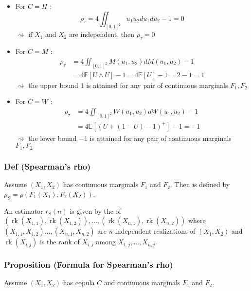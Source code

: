 \begin{itemize}[leftmargin=*]
    \item For $C=\Pi$ :
$$
\rho_{\tau}=4 \iint_{[0,1]^{2}} u_{1} u_{2} d u_{1} d u_{2}-1=0
$$
$\rightsquigarrow$ if $X_{1}$ and $X_{2}$ are independent, then $\rho_{\tau}=0$
    \item For $C=M$ :
$$
\begin{aligned}
\rho_{\tau}&=4 \iint_{[0,1]^{2}} M\left(u_{1}, u_{2}\right) d M\left(u_{1}, u_{2}\right)-1 \\
&=4 \mathbb{E}[U \wedge U]-1=4 \mathbb{E}[U]-1=2-1=1
\end{aligned}
$$
$\rightsquigarrow$ the upper bound 1 is attained for any pair of continuous marginals $F_{1}, F_{2}$
    \item For $C=W$ :
$$
\begin{aligned}
\rho_{\tau}&=4 \iint_{[0,1]^{2}} W\left(u_{1}, u_{2}\right) d W\left(u_{1}, u_{2}\right)-1 \\
&=4 \mathbb{E}\left[(U+(1-U)-1)^{+}\right]-1=-1
\end{aligned}
$$
$\rightsquigarrow$ the lower bound $-1$ is attained for any pair of continuous marginals $F_{1}, F_{2}$
\end{itemize}






\subsubsection*{Def (Spearman’s rho)}
Assume $\left(X_{1}, X_{2}\right)$ has continuous marginals $F_{1}$ and $F_{2}$. Then  is defined by $\rho_{S}=\rho\left(F_{1}\left(X_{1}\right), F_{2}\left(X_{2}\right)\right)$.

An estimator $r_{\mathrm{S}}(n)$ is given by the  of
$ \left(\operatorname{rk}\left(X_{1,1}\right), \operatorname{rk}\left(X_{1,2}\right)\right), \ldots,\left(\operatorname{rk}\left(X_{n, 1}\right), \operatorname{rk}\left(X_{n, 2}\right)\right)$ where $\left(X_{1,1}, X_{1,2}\right) \ldots,\left(X_{n, 1}, X_{n, 2}\right)$ are $n$ independent realizations of $\left(X_{1}, X_{2}\right)$ and $\operatorname{rk}\left(X_{i, j}\right)$ is the rank of $X_{i, j}$ among $X_{1, j}, \ldots, X_{n, j}$.





\subsubsection*{Proposition (Formula for Spearman’s rho)}
Assume $\left(X_{1}, X_{2}\right)$ has copula $C$ and continuous marginals $F_{1}$ and $F_{2}$. 

